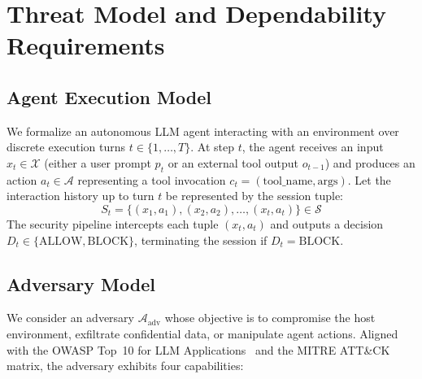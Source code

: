 \documentclass[conference]{IEEEtran}
\begin{document}
\section{Threat Model and Dependability Requirements}

\subsection{Agent Execution Model}
We formalize an autonomous LLM agent interacting with an environment over discrete execution turns $t \in \{1, \dots, T\}$. At step $t$, the agent receives an input $x_t \in \mathcal{X}$ (either a user prompt $p_t$ or an external tool output $o_{t-1}$) and produces an action $a_t \in \mathcal{A}$ representing a tool invocation $c_t = (\text{tool\_name}, \text{args})$. Let the interaction history up to turn $t$ be represented by the session tuple:
\begin{equation}
S_t = \{(x_1, a_1), (x_2, a_2), \dots, (x_t, a_t)\} \in \mathcal{S}
\end{equation}
The security pipeline intercepts each tuple $(x_t, a_t)$ and outputs a decision $D_t \in \{\text{ALLOW}, \text{BLOCK}\}$, terminating the session if $D_t = \text{BLOCK}$.

\subsection{Adversary Model}
We consider an adversary $\mathcal{A}_{\text{adv}}$ whose objective is to compromise the host environment, exfiltrate confidential data, or manipulate agent actions. Aligned with the OWASP Top~10 for LLM Applications~\cite{owasp2023} and the MITRE ATT\&CK matrix, the adversary exhibits four capabilities:
\end{document}
